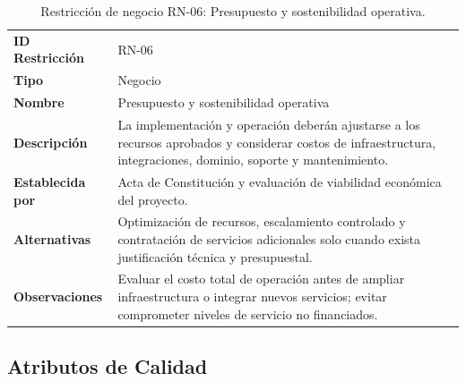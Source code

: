 \documentclass[11pt,a4paper,oneside]{article}
\begin{document}
\begingroup
\small
\setlength{\tabcolsep}{7pt}
\renewcommand{\arraystretch}{1.30}
\setlength{\anchoRegistro}{\dimexpr\textwidth-4\tabcolsep-3\arrayrulewidth\relax}
\begin{table}[H]
\centering
\caption{Restricción de negocio RN-06: Presupuesto y sostenibilidad operativa.}
\label{tab:restriccion-rn-06}
\begin{tabular}{|
>{\RaggedRight\arraybackslash}p{.28\anchoRegistro}|
>{\RaggedRight\arraybackslash}p{.72\anchoRegistro}|}
\hline
\rowcolor{negroTabla}
\multicolumn{2}{|l|}{\color{white}\bfseries Registro de Restricción de Negocio}\\\hline
\cellcolor{azulTabla}\bfseries ID Restricción
& RN-06\\\hline
\cellcolor{azulTabla}\bfseries Tipo
& Negocio\\\hline
\cellcolor{azulTabla}\bfseries Nombre
& Presupuesto y sostenibilidad operativa\\\hline
\cellcolor{azulTabla}\bfseries Descripción
& La implementación y operación deberán ajustarse a los recursos aprobados y considerar costos de infraestructura, integraciones, dominio, soporte y mantenimiento.\\\hline
\cellcolor{azulTabla}\bfseries Establecida por
& Acta de Constitución y evaluación de viabilidad económica del proyecto.\\\hline
\cellcolor{azulTabla}\bfseries Alternativas
& Optimización de recursos, escalamiento controlado y contratación de servicios adicionales solo cuando exista justificación técnica y presupuestal.\\\hline
\cellcolor{azulTabla}\bfseries Observaciones
& Evaluar el costo total de operación antes de ampliar infraestructura o integrar nuevos servicios; evitar comprometer niveles de servicio no financiados.\\\hline
\end{tabular}
\end{table}
\endgroup


\subsection{Atributos de Calidad}
\end{document}
